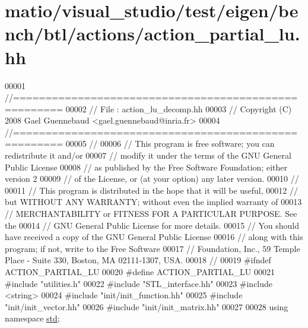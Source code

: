 \hypertarget{matio_2visual__studio_2test_2eigen_2bench_2btl_2actions_2action__partial__lu_8hh_source}{}\section{matio/visual\+\_\+studio/test/eigen/bench/btl/actions/action\+\_\+partial\+\_\+lu.hh}
\label{matio_2visual__studio_2test_2eigen_2bench_2btl_2actions_2action__partial__lu_8hh_source}

\begin{DoxyCode}
00001 \textcolor{comment}{//=====================================================}
00002 \textcolor{comment}{// File   :  action\_lu\_decomp.hh}
00003 \textcolor{comment}{// Copyright (C) 2008 Gael Guennebaud <gael.guennebaud@inria.fr>}
00004 \textcolor{comment}{//=====================================================}
00005 \textcolor{comment}{//}
00006 \textcolor{comment}{// This program is free software; you can redistribute it and/or}
00007 \textcolor{comment}{// modify it under the terms of the GNU General Public License}
00008 \textcolor{comment}{// as published by the Free Software Foundation; either version 2}
00009 \textcolor{comment}{// of the License, or (at your option) any later version.}
00010 \textcolor{comment}{//}
00011 \textcolor{comment}{// This program is distributed in the hope that it will be useful,}
00012 \textcolor{comment}{// but WITHOUT ANY WARRANTY; without even the implied warranty of}
00013 \textcolor{comment}{// MERCHANTABILITY or FITNESS FOR A PARTICULAR PURPOSE.  See the}
00014 \textcolor{comment}{// GNU General Public License for more details.}
00015 \textcolor{comment}{// You should have received a copy of the GNU General Public License}
00016 \textcolor{comment}{// along with this program; if not, write to the Free Software}
00017 \textcolor{comment}{// Foundation, Inc., 59 Temple Place - Suite 330, Boston, MA  02111-1307, USA.}
00018 \textcolor{comment}{//}
00019 \textcolor{preprocessor}{#ifndef ACTION\_PARTIAL\_LU}
00020 \textcolor{preprocessor}{#define ACTION\_PARTIAL\_LU}
00021 \textcolor{preprocessor}{#include "utilities.h"}
00022 \textcolor{preprocessor}{#include "STL\_interface.hh"}
00023 \textcolor{preprocessor}{#include <string>}
00024 \textcolor{preprocessor}{#include "init/init\_function.hh"}
00025 \textcolor{preprocessor}{#include "init/init\_vector.hh"}
00026 \textcolor{preprocessor}{#include "init/init\_matrix.hh"}
00027 
00028 \textcolor{keyword}{using namespace }\hyperlink{namespacestd}{std};

\end{DoxyCode}
